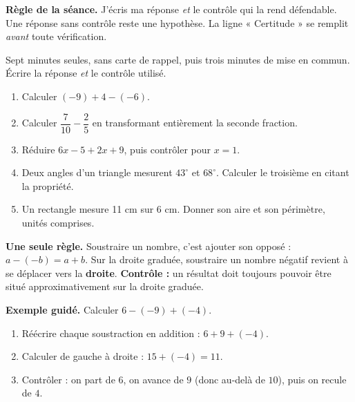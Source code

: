 \documentclass[10pt,a4paper]{article}
\begin{document}
\begin{graybox}\small\textbf{Règle de la séance.} J'écris ma réponse \emph{et} le contrôle qui la rend défendable. Une réponse sans contrôle reste une hypothèse. La ligne « Certitude » se remplit \emph{avant} toute vérification.\end{graybox}
\par\vspace{2mm}
Sept minutes seules, sans carte de rappel, puis trois minutes de mise en commun. Écrire la réponse \emph{et} le contrôle utilisé.
\begin{enumerate}
\item Calculer $(-9) + 4 - (-6)$.
\item Calculer $\dfrac{7}{10} - \dfrac{2}{5}$ en transformant entièrement la seconde fraction.
\item Réduire $6x - 5 + 2x + 9$, puis contrôler pour $x = 1$.
\item Deux angles d'un triangle mesurent $43^\circ$ et $68^\circ$. Calculer le troisième en citant la propriété.
\item Un rectangle mesure 11 cm sur 6 cm. Donner son aire et son périmètre, unités comprises.
\end{enumerate}
\certline
\aideline
\needspace{62mm}\par\vspace{3mm}
\begin{methodbox}
\textbf{Une seule règle.} Soustraire un nombre, c'est ajouter son opposé : $a - (-b) = a + b$.
Sur la droite graduée, soustraire un nombre négatif revient à se déplacer vers la \textbf{droite}.
\textbf{Contrôle :} un résultat doit toujours pouvoir être situé approximativement sur la droite graduée.
\end{methodbox}
\begin{graybox}
\textbf{Exemple guidé.} Calculer $6 - (-9) + (-4)$.
\begin{enumerate}
\item Réécrire chaque soustraction en addition : $6 + 9 + (-4)$.
\item Calculer de gauche à droite : $15 + (-4) = 11$.
\item Contrôler : on part de $6$, on avance de $9$ (donc au-delà de $10$), puis on recule de $4$.
\end{enumerate}
\end{graybox}
\end{document}
